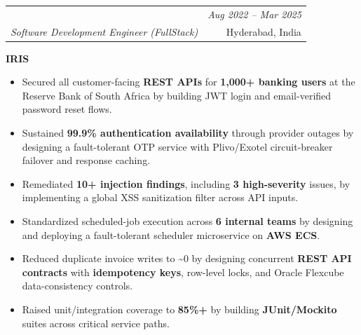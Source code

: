 \documentclass[a4paper,11pt]{article}
\makeatletter
\newcommand{\teamFontSize}[1]{{\fontsize{10}{12}\selectfont #1}}
\newcommand{\resumeSubheading}[4]{
\vspace{0.5mm}\item
  \begin{tabular*}{0.98\textwidth}[t]{l@{\extracolsep{\fill}}r}
    \textbf{#1} & \textit{\footnotesize{#4}} \\
    \textit{\footnotesize{#3}} & \footnotesize{#2}\\
  \end{tabular*}
  \vspace{-2.4mm}
}
\newcommand{\resumeItemListStart}{\begin{justify}\begin{itemize}[leftmargin=3ex,rightmargin=2ex,labelsep=1.2mm,itemsep=2.6pt,topsep=2pt]\small}
\newcommand{\resumeItemListEnd}{\end{itemize}\end{justify}\vspace{-2mm}}
\makeatother
\begin{document}
\vspace{0mm}
\resumeSubheading
  {\begin{large}Beehyv Software Solutions\end{large}}{Hyderabad, India}
  {Software Development Engineer (FullStack)}{Aug 2022 -- Mar 2025}

\vspace{2mm}
\teamFontSize{\textbf{IRIS}}
\vspace{-0.8mm}
\resumeItemListStart
  \item {Secured all customer-facing \textbf{REST APIs} for \textbf{1,000+ banking users} at the Reserve Bank of South Africa by building JWT login and email-verif{}ied password reset flows.}
  \item {Sustained \textbf{99.9\% authentication availability} through provider outages by designing a fault-tolerant OTP service with Plivo/Exotel circuit-breaker failover and response caching.}
  \item {Remediated \textbf{10+ injection f{}indings}, including \textbf{3 high-severity} issues, by implementing a global XSS sanitization f{}ilter across API inputs.}
  \item {Standardized scheduled-job execution across \textbf{6 internal teams} by designing and deploying a fault-tolerant scheduler microservice on \textbf{AWS ECS}.}
  \item {Reduced duplicate invoice writes to \textasciitilde{}0 by designing concurrent \textbf{REST API contracts} with \textbf{idempotency keys}, row-level locks, and Oracle Flexcube data-consistency controls.}
  \item {Raised unit/integration coverage to \textbf{85\%+} by building \textbf{JUnit/Mockito} suites across critical service paths.}
\resumeItemListEnd
\end{document}
